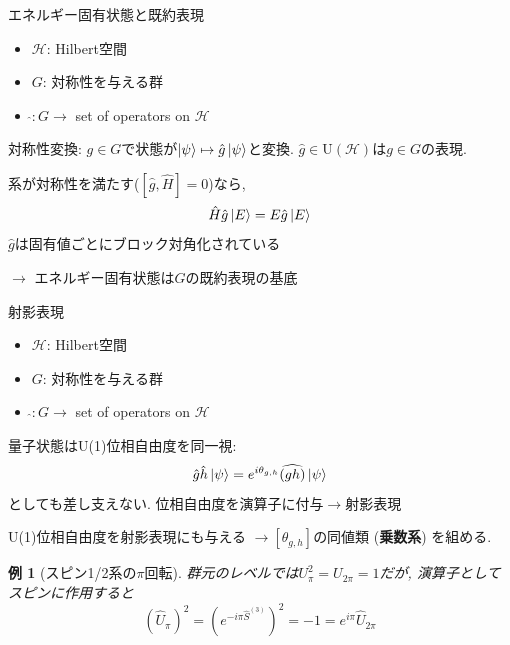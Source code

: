 \documentclass[dvipdfm]{beamer}
\newtheorem*{exmpl}{例}
\begin{document}


\begin{frame}{エネルギー固有状態と既約表現}
    \begin{itemize}
        \item $\mathcal{H}$: Hilbert空間
        \item $G$: 対称性を与える群
        \item $\widehat{}: G\to$ set of operators on $\mathcal{H}$
    \end{itemize}
    対称性変換: $g\in G$で状態が$\ket{\psi}\mapsto\hat{g}\ket{\psi}$と変換.
    $\hat{g}\in\mathrm{U}(\mathcal{H})$は$g\in G$の表現.

    系が対称性を満たす($[\hat{g},\hat{H}]=0$)なら,
    \begin{equation*}
        \hat{H}\hat{g}\ket{E}
        =
        E\hat{g}\ket{E}
    \end{equation*}
    $\hat{g}$は固有値ごとにブロック対角化されている

    $\longrightarrow$
    \alert{エネルギー固有状態は$G$の既約表現の基底}
\end{frame}

\begin{frame}{射影表現}
    \begin{itemize}
        \item $\mathcal{H}$: Hilbert空間
        \item $G$: 対称性を与える群
        \item $\widehat{}: G\to$ set of operators on $\mathcal{H}$
    \end{itemize}
    量子状態はU(1)位相自由度を同一視:
    \begin{equation*}
        \hat{g}\hat{h}\ket{\psi}
        =
        e^{i\theta_{g,h}}\widehat{(gh)}\ket{\psi}
    \end{equation*}
    としても差し支えない.
    位相自由度を演算子に付与$\rightarrow$\alert{射影表現}

    U(1)位相自由度を射影表現にも与える
    $\longrightarrow[\theta_{g,h}]$の同値類 (\textbf{乗数系}) を組める.


    \begin{exmpl}[スピン1/2系の$\pi$回転]
        群元のレベルでは$U_\pi^2=U_{2\pi}=1$だが, 演算子としてスピンに作用すると
        \begin{equation*}
            (\hat{U}_\pi)^2
            =
            (e^{-i\pi\hat{S}^{(3)}})^2
            =
            -1
            =
            e^{i\pi}\hat{U}_{2\pi}
        \end{equation*}
    \end{exmpl}
\end{frame}
\end{document}
